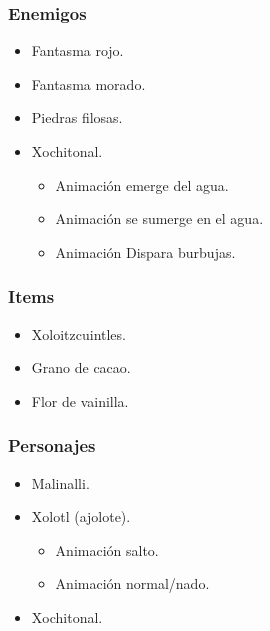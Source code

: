 \documentclass[11pt,letterpaper]{article}
\begin{document}
	\subsubsection{Enemigos}
	\begin{itemize}
		\item Fantasma rojo. 
		\item Fantasma morado. 
		\item Piedras filosas. 
		\item Xochitonal.
			\begin{itemize}
				\item Animación emerge del agua.
				\item Animación se sumerge en el agua.
				\item Animación Dispara burbujas.  
			\end{itemize}
	\end{itemize}
	\subsubsection{Items}
	\begin{itemize}
		\item Xoloitzcuintles.
		\item Grano de cacao.
		\item Flor de vainilla.
	\end{itemize}
	\subsubsection{Personajes}
	\begin{itemize}
		\item Malinalli.
		\item Xolotl (ajolote).
			\begin{itemize}
				\item Animación salto.
				\item Animación normal/nado.
			\end{itemize}
		\item Xochitonal.
	\end{itemize}
	
\end{document}
